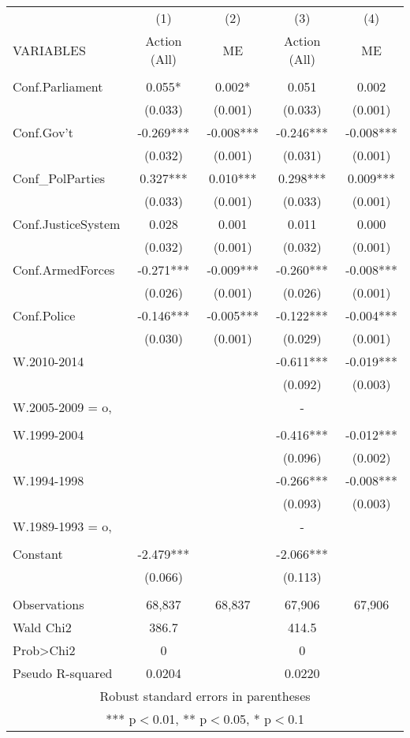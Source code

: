 \documentclass[]{article}
\begin{document}
\begin{tabular}{lcccc} \hline
 & (1) & (2) & (3) & (4) \\
VARIABLES & Action (All) & ME & Action (All) & ME \\ \hline
 &  &  &  &  \\
Conf.Parliament & 0.055* & 0.002* & 0.051 & 0.002 \\
 & (0.033) & (0.001) & (0.033) & (0.001) \\
Conf.Gov't & -0.269*** & -0.008*** & -0.246*** & -0.008*** \\
 & (0.032) & (0.001) & (0.031) & (0.001) \\
Conf\_PolParties & 0.327*** & 0.010*** & 0.298*** & 0.009*** \\
 & (0.033) & (0.001) & (0.033) & (0.001) \\
Conf.JusticeSystem & 0.028 & 0.001 & 0.011 & 0.000 \\
 & (0.032) & (0.001) & (0.032) & (0.001) \\
Conf.ArmedForces & -0.271*** & -0.009*** & -0.260*** & -0.008*** \\
 & (0.026) & (0.001) & (0.026) & (0.001) \\
Conf.Police & -0.146*** & -0.005*** & -0.122*** & -0.004*** \\
 & (0.030) & (0.001) & (0.029) & (0.001) \\
W.2010-2014 &  &  & -0.611*** & -0.019*** \\
 &  &  & (0.092) & (0.003) \\
W.2005-2009 = o, &  &  & - &  \\
 &  &  &  &  \\
W.1999-2004 &  &  & -0.416*** & -0.012*** \\
 &  &  & (0.096) & (0.002) \\
W.1994-1998 &  &  & -0.266*** & -0.008*** \\
 &  &  & (0.093) & (0.003) \\
W.1989-1993 = o, &  &  & - &  \\
 &  &  &  &  \\
Constant & -2.479*** &  & -2.066*** &  \\
 & (0.066) &  & (0.113) &  \\
 &  &  &  &  \\
Observations & 68,837 & 68,837 & 67,906 & 67,906 \\
Wald Chi2 & 386.7 &  & 414.5 &  \\
Prob>Chi2 & 0 &  & 0 &  \\
 Pseudo R-squared & 0.0204 &  & 0.0220 &  \\ \hline
\multicolumn{5}{c}{ Robust standard errors in parentheses} \\
\multicolumn{5}{c}{ *** p$<$0.01, ** p$<$0.05, * p$<$0.1} \\
\end{tabular}
\end{document}
